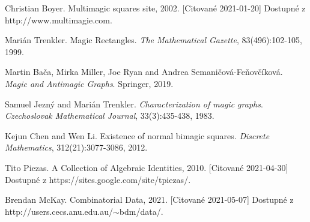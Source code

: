 \documentclass[12pt, twoside]{book}
\begin{document}
\tableofcontents



\newpage 



\mainmatter


 













\newpage	

\backmatter

\thispagestyle{empty}
\clearpage


% 

\begin{thebibliography}{7}
 Christian Boyer. Multimagic squares site, 2002. [Citované 2021-01-20] Dostupné z http://www.multimagie.com.

 Marián Trenkler. Magic Rectangles. \textit{The Mathematical Gazette}, 83(496):102-105, 1999.

 Martin Bača, Mirka Miller, Joe Ryan and Andrea Semaničová-Feňovčíková. \textit{Magic and Antimagic Graphs}. Springer, 2019.

 Samuel Jezný and Marián Trenkler. \textit{Characterization of magic graphs}. \textit{Czechoslovak Mathematical Journal}, 33(3):435-438, 1983.

 Kejun Chen and Wen Li. Existence of normal bimagic squares. \textit{Discrete Mathematics}, 312(21):3077-3086, 2012.

 Tito Piezas. A Collection of Algebraic Identities, 2010. [Citované 2021-04-30] Dostupné z https://sites.google.com/site/tpiezas/.

 Brendan McKay. Combinatorial Data, 2021. [Citované 2021-05-07] Dostupné z http://users.cecs.anu.edu.au/$\sim$bdm/data/.
\end{thebibliography}



%


%
\end{document}
